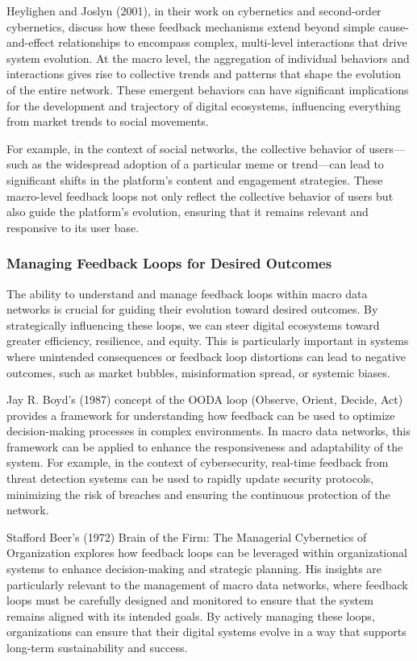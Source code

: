 \documentclass[12pt,twoside]{article}
\begin{document}
Heylighen and Joslyn (2001), in their work on cybernetics and second-order cybernetics, discuss how these feedback mechanisms extend beyond simple cause-and-effect relationships to encompass complex, multi-level interactions that drive system evolution. At the macro level, the aggregation of individual behaviors and interactions gives rise to collective trends and patterns that shape the evolution of the entire network. These emergent behaviors can have significant implications for the development and trajectory of digital ecosystems, influencing everything from market trends to social movements.

For example, in the context of social networks, the collective behavior of users—such as the widespread adoption of a particular meme or trend—can lead to significant shifts in the platform’s content and engagement strategies. These macro-level feedback loops not only reflect the collective behavior of users but also guide the platform’s evolution, ensuring that it remains relevant and responsive to its user base.

\subsubsection{Managing Feedback Loops for Desired Outcomes}

The ability to understand and manage feedback loops within macro data networks is crucial for guiding their evolution toward desired outcomes. By strategically influencing these loops, we can steer digital ecosystems toward greater efficiency, resilience, and equity. This is particularly important in systems where unintended consequences or feedback loop distortions can lead to negative outcomes, such as market bubbles, misinformation spread, or systemic biases.

Jay R. Boyd’s (1987) concept of the OODA loop (Observe, Orient, Decide, Act) provides a framework for understanding how feedback can be used to optimize decision-making processes in complex environments. In macro data networks, this framework can be applied to enhance the responsiveness and adaptability of the system. For example, in the context of cybersecurity, real-time feedback from threat detection systems can be used to rapidly update security protocols, minimizing the risk of breaches and ensuring the continuous protection of the network.

Stafford Beer’s (1972) Brain of the Firm: The Managerial Cybernetics of Organization explores how feedback loops can be leveraged within organizational systems to enhance decision-making and strategic planning. His insights are particularly relevant to the management of macro data networks, where feedback loops must be carefully designed and monitored to ensure that the system remains aligned with its intended goals. By actively managing these loops, organizations can ensure that their digital systems evolve in a way that supports long-term sustainability and success.
\end{document}
